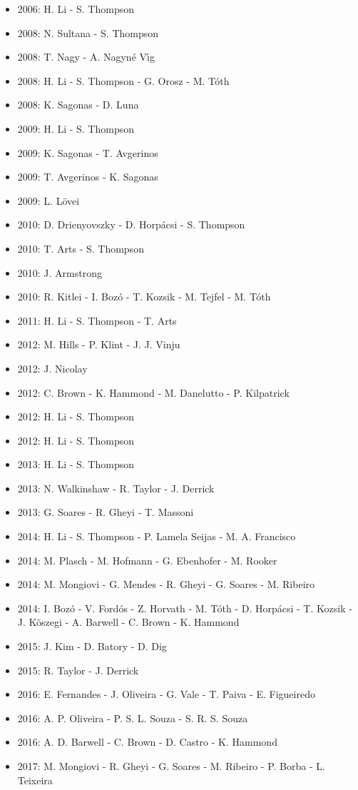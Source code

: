 \begin{itemize}
\item 2006: H. Li - S. Thompson
\item 2008: N. Sultana - S. Thompson
\item 2008: T. Nagy - A. Nagyn{\'e} V\'{\i}g
\item 2008: H. Li - S. Thompson - G. Orosz - M. T\'{o}th
\item 2008: K. Sagonas - D. Luna
\item 2009: H. Li - S. Thompson
\item 2009: K. Sagonas - T. Avgerinos
\item 2009: T. Avgerinos - K. Sagonas
\item 2009: L. L\"{o}vei
\item 2010: D. Drienyovszky - D. Horp\'{a}csi - S. Thompson
\item 2010: T. Arts - S. Thompson
\item 2010: J. Armstrong
\item 2010: R. Kitlei - I. Boz\'{o} - T. Kozsik - M. Tejfel - M. T\'{o}th
\item 2011: H. Li - S. Thompson - T. Arts
\item 2012: M. Hills - P. Klint - J. J. Vinju
\item 2012: J. Nicolay
\item 2012: C. Brown - K. Hammond - M. Danelutto - P. Kilpatrick
\item 2012: H. Li - S. Thompson
\item 2012: H. Li - S. Thompson
\item 2013: H. Li - S. Thompson
\item 2013: N. Walkinshaw - R. Taylor - J. Derrick
\item 2013: G. Soares - R. Gheyi - T. Massoni
\item 2014: H. Li - S. Thompson - P. Lamela Seijas - M. A. Francisco
\item 2014: M. Plasch - M. Hofmann - G. Ebenhofer - M. Rooker
\item 2014: M. Mongiovi - G. Mendes - R. Gheyi - G. Soares - M. Ribeiro
\item 2014: I. Boz\'{o} - V. Ford\'{o}s - Z. Horvath - M. T\'{o}th - D. Horp\'{a}csi - T. Kozsik - J. K\"{o}szegi - A. Barwell - C. Brown - K. Hammond
\item 2015: J. Kim - D. Batory - D. Dig
\item 2015: R. Taylor - J. Derrick
\item 2016: E. Fernandes - J. Oliveira - G. Vale - T. Paiva - E. Figueiredo
\item 2016: A. P. Oliveira - P. S. L. Souza - S. R. S. Souza
\item 2016: A. D. Barwell - C. Brown - D. Castro - K. Hammond
\item 2017: M. Mongiovi - R. Gheyi - G. Soares - M. Ribeiro - P. Borba - L. Teixeira
\end{itemize}

